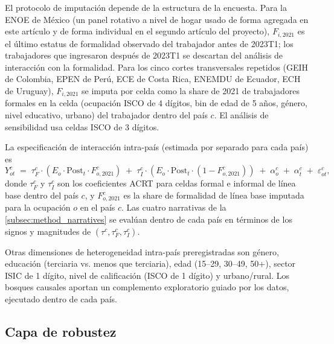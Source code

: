 El protocolo de imputación depende de la estructura de la encuesta. Para la ENOE de México (un panel rotativo a nivel de hogar usado de forma agregada en este art\'{i}culo y de forma individual en el segundo art\'{i}culo del proyecto), $F_{i,2021}$ es el último estatus de formalidad observado del trabajador antes de 2023T1; los trabajadores que ingresaron después de 2023T1 se descartan del análisis de interacción con la formalidad. Para los cinco cortes transversales repetidos (GEIH de Colombia, EPEN de Perú, ECE de Costa Rica, ENEMDU de Ecuador, ECH de Uruguay), $F_{i,2021}$ se imputa por celda como la share de 2021 de trabajadores formales en la celda (ocupación ISCO de 4 dígitos, bin de edad de 5 años, género, nivel educativo, urbano) del trabajador dentro del país $c$. El análisis de sensibilidad usa celdas ISCO de 3 dígitos.

La especificación de interacción intra-país (estimada por separado para cada país) es
\begin{equation}
Y_{ot}^c \;=\; \tau_F^c \cdot (E_{o} \cdot \text{Post}_t \cdot F_{o,2021}^c) \;+\; \tau_I^c \cdot (E_{o} \cdot \text{Post}_t \cdot (1 - F_{o,2021}^c)) \;+\; \alpha_{o}^c \;+\; \alpha_{t}^c \;+\; \varepsilon_{ot}^c,
\label{eq:formality_interaction}
\end{equation}
donde $\tau_F^c$ y $\tau_I^c$ son los coeficientes ACRT para celdas formal e informal de línea base dentro del país $c$, y $F_{o,2021}^c$ es la share de formalidad de línea base imputada para la ocupación $o$ en el país $c$. Las cuatro narrativas de la \cref{subsec:method_narratives} se evalúan dentro de cada país en términos de los signos y magnitudes de $(\tau^c, \tau_F^c, \tau_I^c)$.

Otras dimensiones de heterogeneidad intra-país preregistradas son género, educación (terciaria vs. menos que terciaria), edad (15--29, 30--49, 50+), sector ISIC de 1 dígito, nivel de calificación (ISCO de 1 dígito) y urbano/rural. Los bosques causales \citep{AtheyWager2018_forests} aportan un complemento exploratorio guiado por los datos, ejecutado dentro de cada país.

\subsection{Capa de robustez}
\label{subsec:method_robustness}

